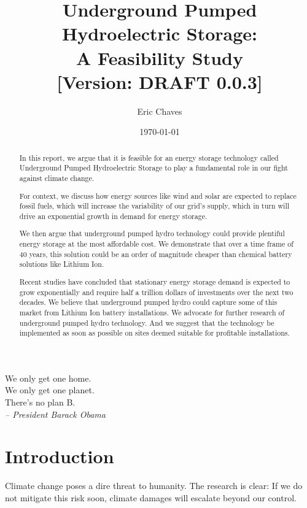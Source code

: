 \documentclass[hidelinks,12pt,a4paper]{article}
\title{%
  \LARGE Underground Pumped Hydroelectric Storage:\\
  \LARGE A Feasibility Study\\
  \bigskip
  \normalsize [Version: DRAFT 0.0.3]
}
\author{\large Eric Chaves}
\date{\large \today}
\begin{document}
\maketitle
\setlength{\parindent}{1em}
\setlength{\parskip}{1em}


\renewcommand{\abstractname}{Abstract}
\begin{abstract}
In this report, we argue that it is feasible for an energy storage technology called Underground Pumped Hydroelectric Storage to play a fundamental role in our fight against climate change.

For context, we discuss how energy sources like wind and solar are expected to replace fossil fuels, which will increase the variability of our grid's supply, which in turn will drive an exponential growth in demand for energy storage.

We then argue that underground pumped hydro technology could provide plentiful energy storage at the most affordable cost. We demonstrate that over a time frame of 40 years, this solution could be an order of magnitude cheaper than chemical battery solutions like Lithium Ion.

Recent studies have concluded that stationary energy storage demand is expected to grow exponentially and require half a trillion dollars of investments over the next two decades. We believe that underground pumped hydro could capture some of this market from Lithium Ion battery installations. We advocate for further research of underground pumped hydro technology. And we suggest that the technology be implemented as soon as possible on sites deemed suitable for profitable installations.

\end{abstract}


\pagebreak
\begin{center}
\hspace{20pt}
\vfill
We only get one home. \\ We only get one planet. \\ There’s no plan B. \\
\bigskip
\textit{-- President Barack Obama}\cite{ObamaIssuesChallengeOnClimateChangeWithPowerPlantRule}
\vfill
\hspace{0pt}
\end{center}

\pagebreak
\renewcommand{\baselinestretch}{0.75}\normalsize
{\footnotesize
  \tableofcontents
}
\renewcommand{\baselinestretch}{1.5}\normalsize

\pagebreak[4]
\section{Introduction}
Climate change poses a dire threat to humanity. The research is clear: If we do not mitigate this risk soon, climate damages will escalate beyond our control.
\end{document}

